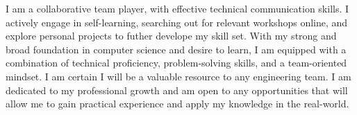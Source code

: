 
\begin{cvparagraph}


	I am a collaborative team player, with effective technical communication
	skills. I actively engage in self-learning, searching out for relevant
	workshops online, and explore personal projects to futher develope my skill
	set. With my strong and broad foundation in computer science and desire to
	learn, I am equipped with a combination of technical proficiency,
	problem-solving skills, and a team-oriented mindset. I am certain I will be a
	valuable resource to any engineering team. I am dedicated to my professional
	growth and am open to any opportunities that will allow me to gain practical
	experience and apply my knowledge in the real-world.

\end{cvparagraph}

